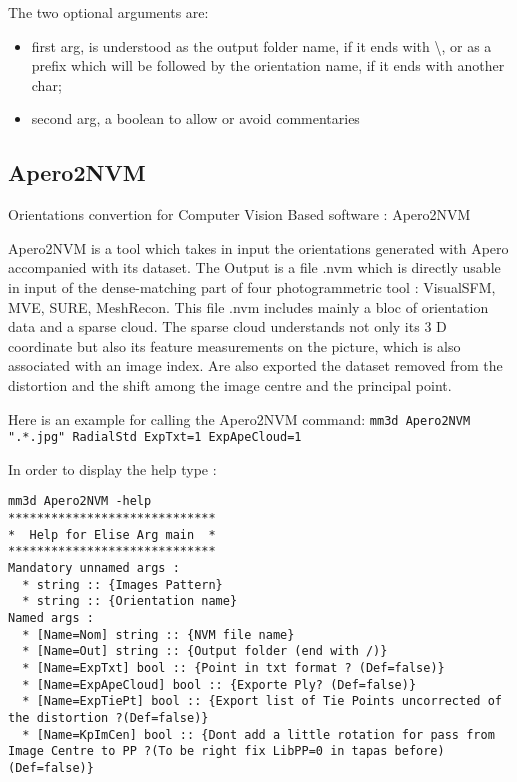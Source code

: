 \vspace{\baselineskip}
The two optional arguments are:
\begin{itemize}
    \item first arg, is understood as the output folder name, if it ends with \textbackslash, or as a prefix which will be followed by the orientation name, if it ends with another char;
    \item second arg, a boolean to allow or avoid commentaries
\end{itemize}

\subsection{Apero2NVM}

Orientations convertion for Computer Vision Based software : Apero2NVM

Apero2NVM is a tool which takes in input the orientations generated with Apero accompanied with its dataset. The Output is a file .nvm which is directly usable in input of the dense-matching part of four photogrammetric tool : VisualSFM, MVE, SURE, MeshRecon. This file .nvm includes mainly a bloc of orientation data and a sparse cloud. The sparse cloud understands not only its 3 D coordinate but also its feature measurements on the picture, which is also associated with an image index.
Are also exported the dataset removed from the distortion and the shift among the image centre and the principal point.

Here is an example for calling the Apero2NVM command:
{\tt mm3d Apero2NVM ".*.jpg" RadialStd ExpTxt=1 ExpApeCloud=1}

In order to display the help type :

\begin{verbatim}
mm3d Apero2NVM -help
*****************************
*  Help for Elise Arg main  *
*****************************
Mandatory unnamed args : 
  * string :: {Images Pattern}
  * string :: {Orientation name}
Named args : 
  * [Name=Nom] string :: {NVM file name}
  * [Name=Out] string :: {Output folder (end with /)}
  * [Name=ExpTxt] bool :: {Point in txt format ? (Def=false)}
  * [Name=ExpApeCloud] bool :: {Exporte Ply? (Def=false)}
  * [Name=ExpTiePt] bool :: {Export list of Tie Points uncorrected of the distortion ?(Def=false)}
  * [Name=KpImCen] bool :: {Dont add a little rotation for pass from Image Centre to PP ?(To be right fix LibPP=0 in tapas before)(Def=false)}
\end{verbatim}

